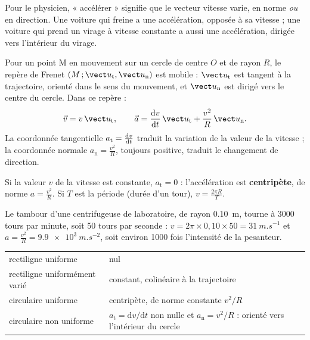 \begin{attention}
Pour le physicien, « accélérer » signifie que le vecteur vitesse varie, en norme \emph{ou} en direction. Une voiture qui
freine a une accélération, opposée à sa vitesse ; une voiture qui prend un virage à vitesse constante a aussi une
accélération, dirigée vers l'intérieur du virage.
\end{attention}
\begin{definition}
Pour un point M en mouvement sur un cercle de centre $O$ et de rayon $R$, le repère de Frenet $(M\,;\ut,\un)$ est mobile :
$\ut$ est tangent à la trajectoire, orienté dans le sens du mouvement, et $\un$ est dirigé vers le centre du cercle.
Dans ce repère :
\[\vec{v}=v\,\ut,\qquad \vec{a}=\ddt{v}\,\ut+\frac{v^2}{R}\,\un.\]
La coordonnée tangentielle $a_\mathrm{t}=\frac{\mathrm{d}v}{\mathrm{d}t}$ traduit la variation de la valeur de la vitesse ; la coordonnée normale
$a_\mathrm{n}=\frac{v^2}{R}$, toujours positive, traduit le changement de direction.
\end{definition}
\begin{propriete}
Si la valeur $v$ de la vitesse est constante, $a_\mathrm{t}=0$ : l'accélération est \textbf{centripète}, de norme
$a=\frac{v^2}{R}$. Si $T$ est la période (durée d'un tour), $v=\frac{2\pi R}{T}$.
\end{propriete}
\begin{exemple}
Le tambour d'une centrifugeuse de laboratoire, de rayon \qty{0,10}{m}, tourne à 3000 tours par minute, soit 50 tours
par seconde : $v=2\pi\times0{,}10\times50=\qty{31}{m.s^{-1}}$ et $a=\frac{v^2}{R}=\qty{9,9e3}{m.s^{-2}}$, soit environ
\num{1000} fois l'intensité de la pesanteur.
\end{exemple}
\begin{propriete}[Récapitulatif]
\par\smallskip
{\small\renewcommand{\arraystretch}{1.3}
\begin{tabularx}{\linewidth}{@{}lY@{}}\toprule
{} & \\\midrule
rectiligne uniforme & nul\\
rectiligne uniformément varié & constant, colinéaire à la trajectoire\\
circulaire uniforme & centripète, de norme constante $v^2/R$\\
circulaire non uniforme & $a_\mathrm{t}=\mathrm{d}v/\mathrm{d}t$ non nulle et $a_\mathrm{n}=v^2/R$ : orienté vers l'intérieur du cercle\\\bottomrule
\end{tabularx}}
\end{propriete}
